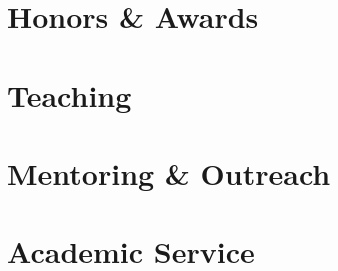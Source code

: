 \section{Honors \& Awards}

\vspace{0pt}
 


\section{Teaching}


\label{sec:mentor}
\section{Mentoring \& Outreach}


\section{Academic Service}


